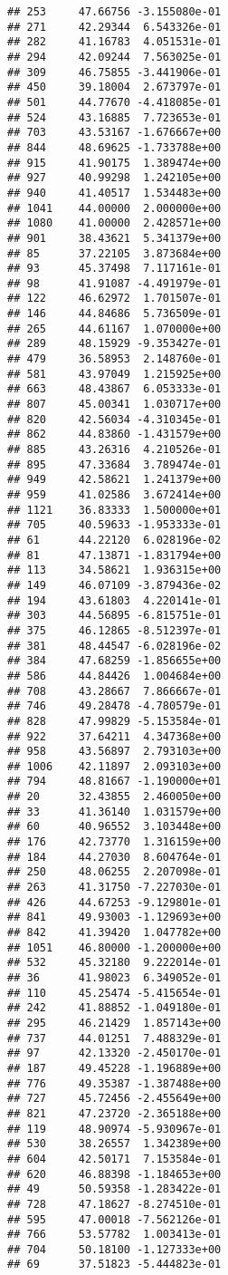 \documentclass[
]{article}
\begin{document}
\begin{verbatim}
## 253     47.66756 -3.155080e-01
## 271     42.29344  6.543326e-01
## 282     41.16783  4.051531e-01
## 294     42.09244  7.563025e-01
## 309     46.75855 -3.441906e-01
## 450     39.18004  2.673797e-01
## 501     44.77670 -4.418085e-01
## 524     43.16885  7.723653e-01
## 703     43.53167 -1.676667e+00
## 844     48.69625 -1.733788e+00
## 915     41.90175  1.389474e+00
## 927     40.99298  1.242105e+00
## 940     41.40517  1.534483e+00
## 1041    44.00000  2.000000e+00
## 1080    41.00000  2.428571e+00
## 901     38.43621  5.341379e+00
## 85      37.22105  3.873684e+00
## 93      45.37498  7.117161e-01
## 98      41.91087 -4.491979e-01
## 122     46.62972  1.701507e-01
## 146     44.84686  5.736509e-01
## 265     44.61167  1.070000e+00
## 289     48.15929 -9.353427e-01
## 479     36.58953  2.148760e-01
## 581     43.97049  1.215925e+00
## 663     48.43867  6.053333e-01
## 807     45.00341  1.030717e+00
## 820     42.56034 -4.310345e-01
## 862     44.83860 -1.431579e+00
## 885     43.26316  4.210526e-01
## 895     47.33684  3.789474e-01
## 949     42.58621  1.241379e+00
## 959     41.02586  3.672414e+00
## 1121    36.83333  1.500000e+01
## 705     40.59633 -1.953333e-01
## 61      44.22120  6.028196e-02
## 81      47.13871 -1.831794e+00
## 113     34.58621  1.936315e+00
## 149     46.07109 -3.879436e-02
## 194     43.61803  4.220141e-01
## 303     44.56895 -6.815751e-01
## 375     46.12865 -8.512397e-01
## 381     48.44547 -6.028196e-02
## 384     47.68259 -1.856655e+00
## 586     44.84426  1.004684e+00
## 708     43.28667  7.866667e-01
## 746     49.28478 -4.780579e-01
## 828     47.99829 -5.153584e-01
## 922     37.64211  4.347368e+00
## 958     43.56897  2.793103e+00
## 1006    42.11897  2.093103e+00
## 794     48.81667 -1.190000e+01
## 20      32.43855  2.460050e+00
## 33      41.36140  1.031579e+00
## 60      40.96552  3.103448e+00
## 176     42.73770  1.316159e+00
## 184     44.27030  8.604764e-01
## 250     48.06255  2.207098e-01
## 263     41.31750 -7.227030e-01
## 426     44.67253 -9.129801e-01
## 841     49.93003 -1.129693e+00
## 842     41.39420  1.047782e+00
## 1051    46.80000 -1.200000e+00
## 532     45.32180  9.222014e-01
## 36      41.98023  6.349052e-01
## 110     45.25474 -5.415654e-01
## 242     41.88852 -1.049180e-01
## 295     46.21429  1.857143e+00
## 737     44.01251  7.488329e-01
## 97      42.13320 -2.450170e-01
## 187     49.45228 -1.196889e+00
## 776     49.35387 -1.387488e+00
## 727     45.72456 -2.455649e+00
## 821     47.23720 -2.365188e+00
## 119     48.90974 -5.930967e-01
## 530     38.26557  1.342389e+00
## 604     42.50171  7.153584e-01
## 620     46.88398 -1.184653e+00
## 49      50.59358 -1.283422e-01
## 728     47.18627 -8.274510e-01
## 595     47.00018 -7.562126e-01
## 766     53.57782  1.003413e-01
## 704     50.18100 -1.127333e+00
## 69      37.51823 -5.444823e-01
\end{verbatim}
\end{document}

